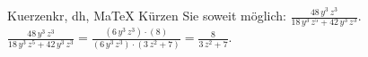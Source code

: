 \begin{MAufgabe}{Kuerzen}{kr, dh, MaTeX}
K\"urzen Sie soweit m\"oglich: $\frac{48\, y^3\, z^3}{18\, y^3\, z^5 + 42\, y^3\, z^3}$.\\ 
\ifLsg\MLoesung
\quad $\frac{48\, y^3\, z^3}{18\, y^3\, z^5 + 42\, y^3\, z^3}=\frac{(6\, y^3\, z^3)\cdot(8)}{(6\, y^3\, z^3)\cdot(3\, z^2 + 7)}=\frac{8}{3\, z^2 + 7}$.\else\relax\fi
 \end{MAufgabe}